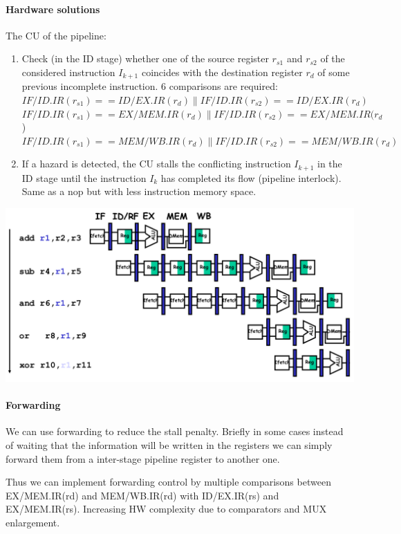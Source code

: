 \paragraph{Hardware solutions}
The CU of the pipeline:
\begin{enumerate}
    \item Check (in the ID stage) whether one of the source register $r_{s1}$ and $r_{s2}$ of the considered instruction $I_{k+1}$ coincides with the destination register $r_d$ of some previous incomplete instruction. 6 comparisons are required:\\
    $IF/ID.IR(r_{s1}) == ID/EX.IR(r_d) \|  IF/ID.IR(r_{s2}) == ID/EX.IR(r_d)$\\
    $IF/ID.IR(r_{s1}) == EX/MEM.IR(r_d) \|  IF/ID.IR(r_{s2}) == EX/MEM.IR(r_d$)\\
    $IF/ID.IR(r_{s1}) == MEM/WB.IR(r_d) \|  IF/ID.IR(r_{s2}) == MEM/WB.IR(r_d)$
    
    \item If a hazard is detected, the CU stalls the conflicting instruction $I_{k+1}$ in the ID stage until the instruction $I_k$ has completed its flow (pipeline interlock). Same as a nop but with less instruction memory space.
\end{enumerate}
\includegraphics[width=\textwidth]{images/pipeline_CU_scheme.png}

\paragraph{Forwarding}
We can use forwarding to reduce the stall penalty. Briefly in some cases instead of waiting that the information will be written in the registers we can simply forward them from a inter-stage pipeline register to another one.

Thus we can implement forwarding control by multiple comparisons between EX/MEM.IR(rd) and MEM/WB.IR(rd) with ID/EX.IR(rs) and EX/MEM.IR(rs). Increasing HW complexity due to comparators and MUX enlargement.

